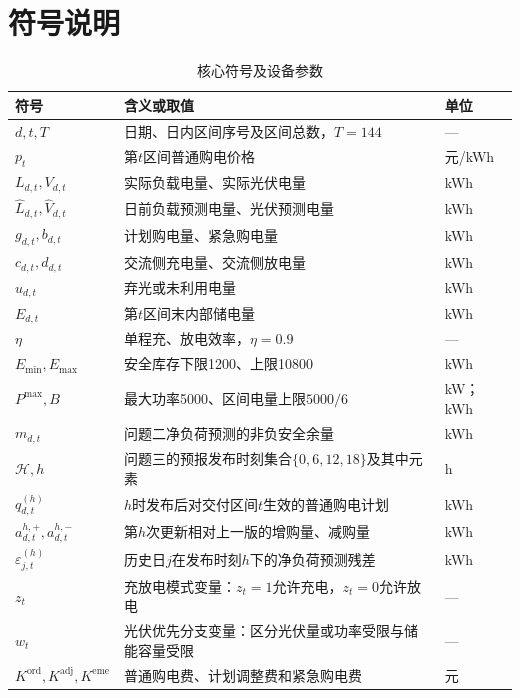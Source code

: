 \documentclass[UTF8,a4paper,12pt]{ctexart}
\begin{document}

\section{符号说明}

\begin{table}[H]
  \centering\small
  \caption{核心符号及设备参数}\label{tab:symbols}
  \begin{tabularx}{\linewidth}{lXl}
    \toprule
    符号 & 含义或取值 & 单位\\
    \midrule
    $d,t,T$ & 日期、日内区间序号及区间总数，$T=144$ & ---\\
    $p_t$ & 第$t$区间普通购电价格 & 元/kWh\\
    $L_{d,t},V_{d,t}$ & 实际负载电量、实际光伏电量 & kWh\\
    $\widehat L_{d,t},\widehat V_{d,t}$ & 日前负载预测电量、光伏预测电量 & kWh\\
    $g_{d,t},b_{d,t}$ & 计划购电量、紧急购电量 & kWh\\
    $c_{d,t},d_{d,t}$ & 交流侧充电量、交流侧放电量 & kWh\\
    $u_{d,t}$ & 弃光或未利用电量 & kWh\\
    $E_{d,t}$ & 第$t$区间末内部储电量 & kWh\\
    $\eta$ & 单程充、放电效率，$\eta=0.9$ & ---\\
    $E_{\min},E_{\max}$ & 安全库存下限1200、上限10800 & kWh\\
    $P^{\max},B$ & 最大功率5000、区间电量上限$5000/6$ & kW；kWh\\
    $m_{d,t}$ & 问题二净负荷预测的非负安全余量 & kWh\\
    $\mathcal H,h$ & 问题三的预报发布时刻集合$\{0,6,12,18\}$及其中元素 & h\\
    $q_{d,t}^{(h)}$ & $h$时发布后对交付区间$t$生效的普通购电计划 & kWh\\
    $a_{d,t}^{h,+},a_{d,t}^{h,-}$ & 第$h$次更新相对上一版的增购量、减购量 & kWh\\
    $\varepsilon_{j,t}^{(h)}$ & 历史日$j$在发布时刻$h$下的净负荷预测残差 & kWh\\
    $z_t$ & 充放电模式变量：$z_t=1$允许充电，$z_t=0$允许放电 & ---\\
    $w_t$ & 光伏优先分支变量：区分光伏量或功率受限与储能容量受限 & ---\\
    $K^{\mathrm{ord}},K^{\mathrm{adj}},K^{\mathrm{eme}}$ & 普通购电费、计划调整费和紧急购电费 & 元\\
    \bottomrule
  \end{tabularx}
\end{table}
\end{document}
